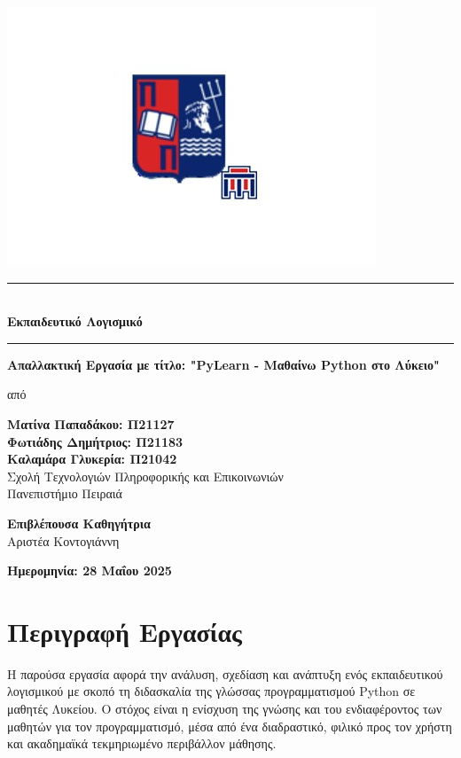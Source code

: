 \documentclass[11pt]{report}
\newcommand{\studentname}{Ματίνα Παπαδάκου: Π21127 \\ Φωτιάδης Δημήτριος: Π21183 \\ 
Καλαμάρα Γλυκερία: Π21042}
\newcommand{\projecttitle}{Εκπαιδευτικό Λογισμικό}
\newcommand{\supervisorA}{Αριστέα Κοντογιάννη}
\newcommand{\university}{Πανεπιστήμιο Πειραιά}
\newcommand{\school}{Σχολή Τεχνολογιών Πληροφορικής και Επικοινωνιών}
\begin{document}
\begin{titlepage}
    \begin{center}
\includegraphics[width=0.5\linewidth]{Figures/papei.jpg}
        \vspace{0.5cm}
        \rule{15cm}{2.5pt} \\
        \textbf{\Huge \projecttitle} \\
        \rule{15cm}{2.5pt}
        
        \vspace{1cm}
        \textbf{\Large Απαλλακτική Εργασία με τίτλο: "PyLearn - Μαθαίνω Python στο
Λύκειο" \\}

        \vspace{0.5cm}
        από
        
        \vspace{0.5cm}
        \textbf{\LARGE \studentname} \\
        
        \vspace{0.8cm}
        \school \\
        \university
        
        \vspace{1.5cm}
        \textbf{\large Επιβλέπουσα Καθηγήτρια} \\
        \supervisorA
        
        \vspace{2.5cm}
        \textbf{\large Ημερομηνία: 28 Μαΐου 2025}
    \end{center}
\end{titlepage}

\tableofcontents
\clearpage
{}

\chapter{Περιγραφή Εργασίας}

Η παρούσα εργασία αφορά την ανάλυση, σχεδίαση και ανάπτυξη ενός εκπαιδευτικού λογισμικού με σκοπό τη διδασκαλία της γλώσσας προγραμματισμού Python σε μαθητές Λυκείου. Ο στόχος είναι η ενίσχυση της γνώσης και του ενδιαφέροντος των μαθητών για τον προγραμματισμό, μέσα από ένα διαδραστικό, φιλικό προς τον χρήστη και ακαδημαϊκά τεκμηριωμένο περιβάλλον μάθησης. 
\end{document}
